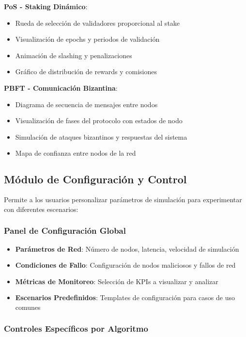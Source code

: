 \documentclass[spanish,12pt,letterpaper]{report}
\begin{document}
\textbf{PoS - Staking Dinámico}:
\begin{itemize}
    \item Rueda de selección de validadores proporcional al stake
    \item Visualización de epochs y periodos de validación
    \item Animación de slashing y penalizaciones
    \item Gráfico de distribución de rewards y comisiones
\end{itemize}

\textbf{PBFT - Comunicación Bizantina}:
\begin{itemize}
    \item Diagrama de secuencia de mensajes entre nodos
    \item Visualización de fases del protocolo con estados de nodo
    \item Simulación de ataques bizantinos y respuestas del sistema
    \item Mapa de confianza entre nodos de la red
\end{itemize}

\subsection{Módulo de Configuración y Control}

Permite a los usuarios personalizar parámetros de simulación para experimentar con diferentes escenarios:

\subsubsection{Panel de Configuración Global}
\begin{itemize}
    \item \textbf{Parámetros de Red}: Número de nodos, latencia, velocidad de simulación
    \item \textbf{Condiciones de Fallo}: Configuración de nodos maliciosos y fallos de red
    \item \textbf{Métricas de Monitoreo}: Selección de KPIs a visualizar y analizar
    \item \textbf{Escenarios Predefinidos}: Templates de configuración para casos de uso comunes
\end{itemize}

\subsubsection{Controles Específicos por Algoritmo}
\end{document}
